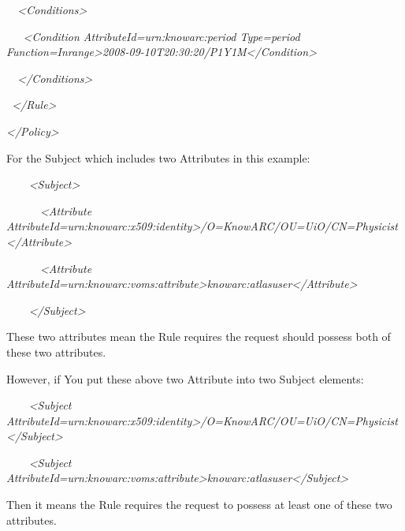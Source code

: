 \documentclass[a4paper]{article}
\begin{document}
{\itshape\color{black}
\ \ {\textless}Conditions{\textgreater}}

{\itshape\color{black}
\ \ \ {\textless}Condition
AttributeId={\textquotedbl}urn:knowarc:period{\textquotedbl}
Type={\textquotedbl}period{\textquotedbl}
Function={\textquotedbl}Inrange{\textquotedbl}{\textgreater}2008-09-10T20:30:20/P1Y1M{\textless}/Condition{\textgreater}}

{\itshape\color{black}
\ \ {\textless}/Conditions{\textgreater}}

{\itshape\color{black}
\ {\textless}/Rule{\textgreater}}

{\itshape\color{black}
{\textless}/Policy{\textgreater}}

{\color{black}
For the Subject which includes two Attributes in this example:}

{\itshape\color{black}
\ \ \ \ {\textless}Subject{\textgreater}}

{\itshape\color{black}
\ \ \ \ \ \ {\textless}Attribute
AttributeId={\textquotedbl}urn:knowarc:x509:identity{\textquotedbl}{\textgreater}/O=KnowARC/OU=UiO/CN=Physicist{\textless}/Attribute{\textgreater}}

{\itshape\color{black}
\ \ \ \ \ \ {\textless}Attribute
AttributeId={\textquotedbl}urn:knowarc:voms:attribute{\textgreater}knowarc:atlasuser{\textless}/Attribute{\textgreater}}

{\itshape\color{black}
\ \ \ \ {\textless}/Subject{\textgreater}}

{\color{black}
These two attributes mean the Rule requires the request should possess
both of these two attributes.}

{\color{black}
However, if You put these above two Attribute into two Subject
elements:}

{\itshape\color{black}
\ \ \ \ {\textless}Subject
AttributeId={\textquotedbl}urn:knowarc:x509:identity{\textquotedbl}{\textgreater}/O=KnowARC/OU=UiO/CN=Physicist{\textless}/Subject{\textgreater}}

{\itshape\color{black}
\ \ \ \ {\textless}Subject
AttributeId={\textquotedbl}urn:knowarc:voms:attribute{\textgreater}knowarc:atlasuser{\textless}/Subject{\textgreater}}

{\color{black}
Then it means the Rule requires the request to possess at least one of
these two attributes.}
\end{document}
